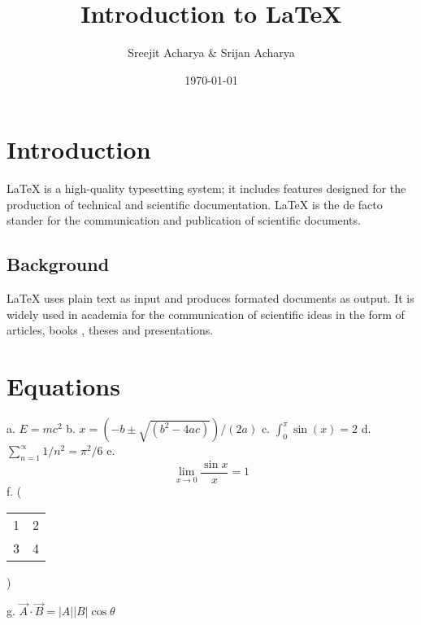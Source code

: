 \documentclass[11pt]{article}
\title{Introduction to LaTeX}
\author{Sreejit Acharya \& Srijan Acharya}
\begin{document}
\maketitle
\date{\today}


\section{Introduction}
LaTeX is a high-quality typesetting system; it includes features designed for the production of technical and scientific documentation. LaTeX is the de facto stander for the communication and publication of scientific documents.
\subsection{Background}
LaTeX uses plain text as input and produces formated documents as output. It is widely used in academia for the communication of scientific ideas in the form of articles, books , theses and presentations.

\section{Equations}
a. $E = mc^{2}$ \newline
b. $x = (-b \pm \sqrt{(b^{2}-4ac)})/(2a)$ \newline
c. $\int_{0}^{\pi}\sin(x) = 2$ \newline
d. $\sum_{n=1}^{\propto} 1/n^{2} = \pi^{2}/6$ \newline
e. $$\lim_{x \rightarrow 0}\frac{\sin x}{x} = 1$$ \newline
f.
\left(
\begin{tabular}{cc}
 1&2\\ 3&4\\ 
 \end{tabular}
 \right)
 
 g. $ \vec{A} \cdot \vec{B} = |A||B|\cos\theta$ 
 
 \begin{thebibliography}
 
 \end{thebibliography}
\end{document}
